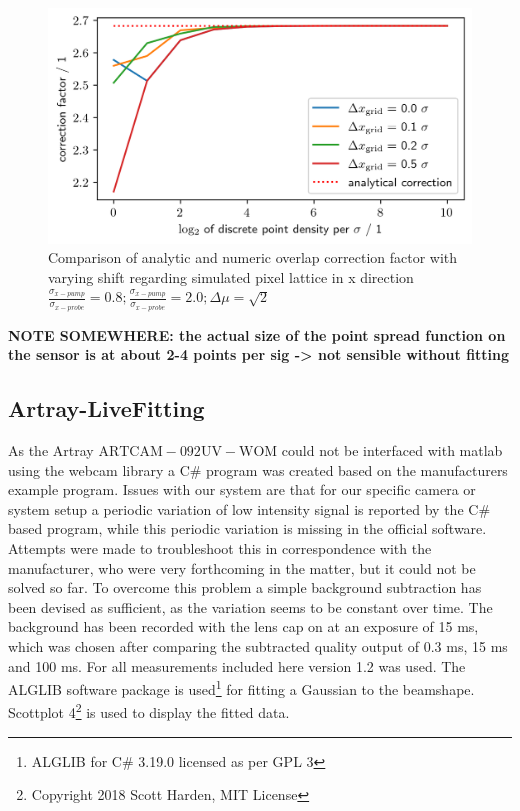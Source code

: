 \documentclass[twoside,openright]{scrreprt}
\begin{document}
\begin{figure}[h]
\centering
\includegraphics[width=0.9\linewidth]{images/NumericalCorrectionShiftedBeams.png}
\caption{Comparison of analytic  and numeric overlap correction factor with varying shift regarding simulated pixel lattice in x direction
\\$\frac{\sigma_{x-pump}}{\sigma_{x-probe}}=0.8;\frac{\sigma_{x-pump}}{\sigma_{x-probe}}=2.0;\Delta\mu = \sqrt{2}$\label{fig:NumericalCorrectionShift}}
\end{figure}
\textbf{NOTE SOMEWHERE: the actual size of the point spread function on the sensor is at about 2-4 points per sig -> not sensible without fitting}

\subsection{Artray-LiveFitting}\label{Sec:LiveFitting}
As the Artray $\mathrm{ARTCAM-092UV-WOM}$ could not be interfaced with matlab using the webcam library a C\# program was created based on the manufacturers example program.
Issues with our system are that for our specific camera or system setup a periodic variation of low intensity signal is reported by the C\# based program, while this periodic variation is missing in the official software. Attempts were made to troubleshoot this in correspondence with the manufacturer, who were very forthcoming in the matter, but it could not be solved so far. To overcome this problem a simple background subtraction has been devised as sufficient, as the variation seems to be constant over time. The background has been recorded with the lens cap on at an exposure of 15 ms, which was chosen after comparing the subtracted quality output of 0.3 ms, 15 ms and 100 ms. 
\newline
For all measurements included here version 1.2 was used. The  ALGLIB software package is used\footnote{ALGLIB for C\# 3.19.0 licensed as per GPL 3} for fitting a Gaussian to the beamshape. Scottplot 4\footnote{Copyright 2018 Scott Harden, MIT License} is used to display the fitted data.\\
\end{document}
